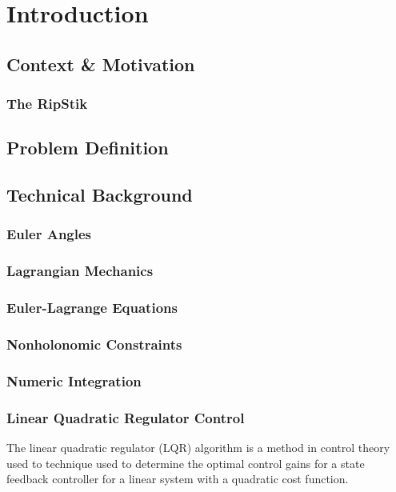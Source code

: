 \section{Introduction}
\subsection{Context \& Motivation}
\subsubsection{The RipStik}
\subsection{Problem Definition}
\subsection{Technical Background}
\subsubsection{Euler Angles}
\subsubsection{Lagrangian Mechanics}
\subsubsection{Euler-Lagrange Equations}
\subsubsection{Nonholonomic Constraints}
\subsubsection{Numeric Integration}
\subsubsection{Linear Quadratic Regulator Control}
The linear quadratic regulator (LQR) algorithm is a method in control theory used to technique used to determine the optimal control gains for a state feedback controller for a linear system with a quadratic cost function.

